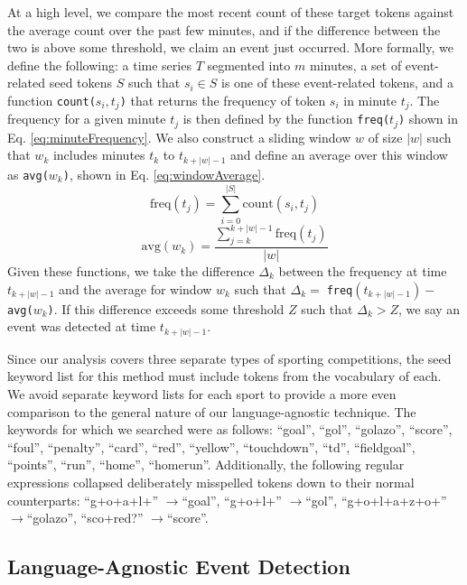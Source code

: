 \documentclass{acm_proc_article-sp}
\begin{document}
At a high level, we compare the most recent count of these target tokens against the average count over the past few minutes, and if the difference between the two is above some threshold, we claim an event just occurred.
More formally, we define the following: a time series $T$ segmented into $m$ minutes, a set of event-related seed tokens $S$ such that $s_i \in S$ is one of these event-related tokens, and a function \texttt{count($s_i, t_j$)} that returns the frequency of token $s_i$ in minute $t_j$.
The frequency for a given minute $t_j$ is then defined by the function \texttt{freq($t_j$)} shown in Eq. \ref{eq:minuteFrequency}.
We also construct a sliding window $w$ of size $|w|$ such that $w_k$ includes minutes $t_k$ to $t_{k+|w|-1}$ and define an average over this window as \texttt{avg($w_k$)}, shown in Eq. \ref{eq:windowAverage}.
%
\begin{equation}
\label{eq:minuteFrequency}
\text{freq}(t_j) = \sum_{i=0}^{|S|}\text{count}(s_i, t_j)
\end{equation}
\begin{equation}
\label{eq:windowAverage}
\text{avg}(w_k) = \frac{\sum_{j=k}^{k + |w| - 1}\text{freq}(t_j)}{|w|}
\end{equation}
%
Given these functions, we take the difference $\Delta_k$ between the frequency at time $t_{k+|w|-1}$ and the average for window $w_k$ such that $\Delta_k = \;$\texttt{freq}$(t_{k+|w|-1}) - $ \texttt{avg($w_k$)}.
If this difference exceeds some threshold $Z$ such that $\Delta_k > Z$, we say an event was detected at time $t_{k+|w|-1}$.

Since our analysis covers three separate types of sporting competitions, the seed keyword list for this method must include tokens from the vocabulary of each. 
We avoid separate keyword lists for each sport to provide a more even comparison to the general nature of our language-agnostic technique.
The keywords for which we searched were as follows: ``goal'', ``gol'', ``golazo'', ``score'', ``foul'', ``penalty'', ``card'', ``red'', ``yellow'', ``touchdown'', ``td'', ``fieldgoal'', ``points'', ``run'', ``home'', ``homerun''.
Additionally, the following regular expressions collapsed deliberately misspelled tokens down to their normal counterparts: ``g+o+a+l+'' $\rightarrow$``goal'', ``g+o+l+'' $\rightarrow$``gol'', ``g+o+l+a+z+o+'' $\rightarrow$``golazo'', ``sco+red?'' $\rightarrow$``score''.

\subsection{Language-Agnostic Event Detection}
\end{document}
